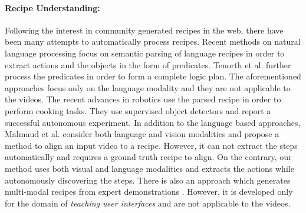 \paragraph{Recipe Understanding:}
Following the interest in community generated recipes in the web, there have been many attempts to automatically process recipes. Recent methods on natural language processing \cite{cookingSemantics,logicRecipe} focus on semantic parsing of language recipes in order to extract actions and the objects in the form of predicates. Tenorth et al.\cite{logicRecipe} further process the predicates in order to form a complete logic plan. The aforementioned approaches focus only on the language modality and they are not applicable to the videos. The recent advances \cite{beetz,cookie} in robotics use the parsed recipe in order to perform cooking tasks. They use supervised object detectors and report a successful autonomous experiment. In addition to the language based approaches, Malmaud et al.\cite{alignment} consider both language and vision modalities and propose a method to align an input video to a recipe. However, it can not extract the steps automatically and requires a ground truth recipe to align. On the contrary, our method uses both visual and language modalities and extracts the actions while autonomously discovering the steps. There is also an approach which generates multi-modal recipes from expert demonstrations \cite{photoshop}. However, it is developed only for the domain of \emph{teaching user interfaces} and are not applicable to the videos.
